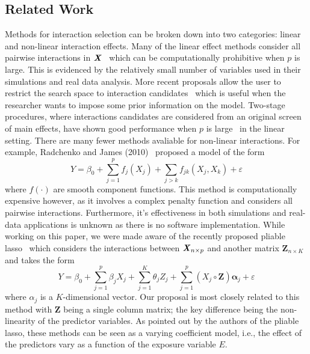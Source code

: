 \documentclass[12pt,letter]{article}\usepackage[]{graphicx}\usepackage[]{color}
\newcommand{\bX}{\textbf{\emph{X}}}
\newcommand{\balpha}{\boldsymbol{\alpha}}
\begin{document}
\subsection{Related Work}
Methods for interaction selection can be broken down into two categories: linear and non-linear interaction effects. 
Many of the linear effect methods consider all pairwise interactions in $\bX$~\citep{zhao2009composite,choi2010variable,bien2013lasso, she2014group} which can be computationally prohibitive when $p$ is large. This is evidenced by the relatively small number of variables used in their simulations and real data analysis. 
More recent proposals allow the user to restrict the search space to interaction candidates~\citep{lim2015learning,haris2016convex} which is useful when the researcher wants to impose some prior information on the model. 
Two-stage procedures, where interactions candidates are considered from an original screen of main effects, have shown good performance when $p$ is large~\citep{hao2018model,shah2016modelling} in the linear setting.  
There are many fewer methods avaliable for non-linear interactions. For example, Radchenko and James (2010)~\citep{radchenko2010variable} proposed a model of the form
\[Y = \beta_0 + \sum_{j=1}^{p} f_j(X_j) + \sum_{j>k}f_{jk}(X_j, X_k) + \varepsilon\]
where $f(\cdot)$ are smooth component functions. This method is computationally expensive however, as it involves a complex penalty function and considers all pairwise interactions. 
Furthermore, it's effectiveness in both simulations and real-data applications is unknown as there is no software implementation.  
While working on this paper, we were made aware of the recently proposed pliable lasso~\citep{tibshirani2017pliable} which considers the interactions between $\bX_{n \times p}$ and another matrix $\mathbf{Z}_{n\times K}$ and takes the form
\[Y = \beta_0 + \sum_{j=1}^{p}\beta_j X_j + \sum_{j=1}^{K}\theta_j Z_j + \sum_{j=1}^{p} (X_j \circ \mathbf{Z}) \balpha_j + \varepsilon  \] where $\alpha_j$ is a $K$-dimensional vector. Our proposal is most closely related to this method with $\mathbf{Z}$ being a single column matrix; the key difference being the non-linearity of the predictor variables. 
As pointed out by the authors of the pliable lasso, these methods can be seen as a varying coefficient model, i.e., the effect of the predictors vary as a function of the exposure variable $E$. 
\end{document}
